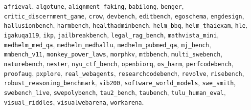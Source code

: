 \texttt{afrieval}, \texttt{algotune}, \texttt{alignment\_faking}, \texttt{babilong}, \texttt{benger}, \texttt{critic\_discernment\_game}, \texttt{crow}, \texttt{devbench}, \texttt{editbench}, \texttt{egoschema}, \texttt{engdesign}, \texttt{hallusionbench}, \texttt{harmbench}, \texttt{healthadminbench}, \texttt{helm\_bbq}, \texttt{helm\_thaiexam}, \texttt{hle}, \texttt{igakuqa119}, \texttt{ikp}, \texttt{jailbreakbench}, \texttt{legal\_rag\_bench}, \texttt{mathvista\_mini}, \texttt{medhelm\_med\_qa}, \texttt{medhelm\_medhallu}, \texttt{medhelm\_pubmed\_qa}, \texttt{mj\_bench}, \texttt{mmbench\_v11}, \texttt{monkey\_power\_laws}, \texttt{morphkv}, \texttt{mtbbench}, \texttt{multi\_swebench}, \texttt{naturebench}, \texttt{nester}, \texttt{nyu\_ctf\_bench}, \texttt{openbiorq}, \texttt{os\_harm}, \texttt{perfcodebench}, \texttt{proofaug}, \texttt{pxplore}, \texttt{real\_webagents}, \texttt{researchcodebench}, \texttt{revolve}, \texttt{risebench}, \texttt{robust\_reasoning\_benchmark}, \texttt{sib200}, \texttt{software\_world\_models}, \texttt{swe\_smith}, \texttt{swebench\_live}, \texttt{swepolybench}, \texttt{tau2\_bench}, \texttt{taubench}, \texttt{tulu\_human\_eval}, \texttt{visual\_riddles}, \texttt{visualwebarena}, \texttt{workarena}.
